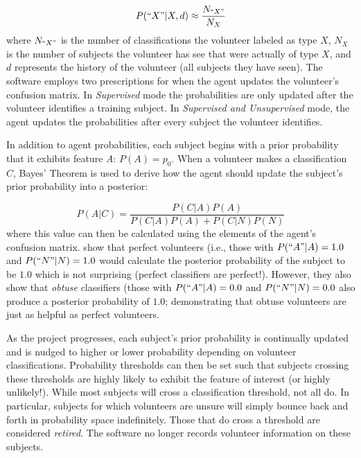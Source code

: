 \documentclass[twocolumn]{aastex6}
\newcommand{\A}{\textit{A}}
\begin{document}
\begin{equation}
P(``X" | X, d) \approx \frac{N_{``X"}}{N_{X}}
\end{equation}
where $N_{``X"}$ is the number of classifications the volunteer labeled as type $X$, 
$N_X$ is the number of subjects the volunteer has see that were actually of type $X$,
and $d$ represents the history of the volunteer (all subjects they have seen). 
The software employs two prescriptions for when the 
agent updates the volunteer's confusion matrix. In \textit{Supervised} mode the 
probabilities are only updated after the volunteer identifies a training subject.
In \textit{Supervised and Unsupervised} mode, the agent
updates the probabilities after every subject the volunteer identifies.  

In addition to agent probabilities, each subject begins with a prior probability 
that it exhibits feature \A: $P(A) = p_0$. 
When a volunteer makes a classification $C$, Bayes' Theorem is used to derive how 
the agent should update the subject's prior probability into a posterior: 

\begin{equation}
P(A|C) = \frac{ P(C|A) P(A) }{P(C|A) P(A) + P(C|N) P(N)}
\end{equation}
where this value can then be calculated using the elements of the agent's 
confusion matrix. \cite{Marshall2016} show that perfect volunteers (i.e., those 
with $P(``A"| A) = 1.0$ and $P(``N" | N) = 1.0$ would calculate the posterior
probability of the subject to be $1.0$ which is not surprising (perfect classifiers 
are perfect!). However, they also show that \textit{obtuse} classifiers (those with 
$P(``A" | A) = 0.0$ and $P(``N" | N) = 0.0$ also produce a posterior probability 
of $1.0$; demonstrating that obtuse volunteers are just as helpful as perfect volunteers.

As the project progresses, each subject's prior probability is continually updated 
and is nudged to higher or lower probability depending on volunteer classifications.
Probability thresholds can then be set such that subjects crossing these thresholds 
are highly likely to exhibit the feature of interest (or highly unlikely!). While most subjects
will cross a classification threshold, not all do. In particular, subjects for 
which volunteers are unsure will simply bounce back and forth in probability space indefinitely. 
Those that do cross a threshold are considered \textit{retired}. The software no
longer records volunteer information on these subjects. 
\end{document}
